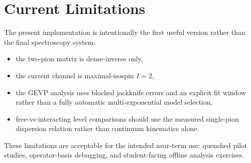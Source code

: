 \documentclass[11pt]{article}
\begin{document}
\section{Current Limitations}
The present implementation is intentionally the first useful version rather than
the final spectroscopy system:
\begin{itemize}
  \item the two-pion matrix is dense-inverse only,
  \item the current channel is maximal-isospin $I=2$,
  \item the GEVP analysis uses blocked jackknife errors and an explicit fit
  window rather than a fully automatic multi-exponential model selection,
  \item free-vs-interacting level comparisons should use the measured
  single-pion dispersion relation rather than continuum kinematics alone.
\end{itemize}
These limitations are acceptable for the intended near-term use:
quenched pilot studies, operator-basis debugging, and student-facing offline
analysis exercises.
\end{document}
